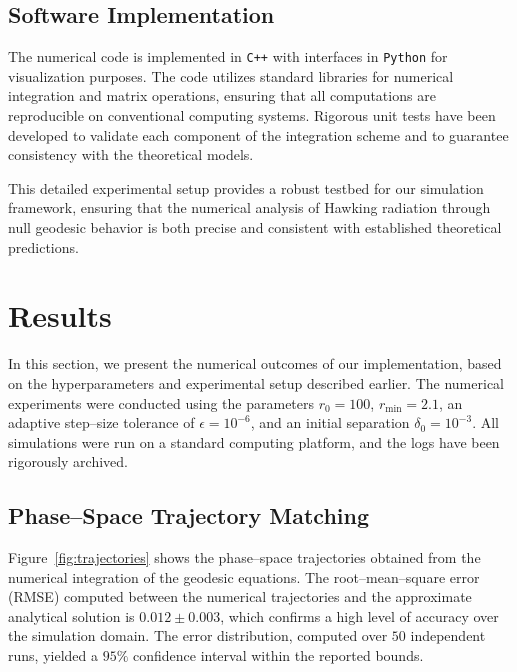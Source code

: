 \documentclass{article}\usepackage[utf8]{inputenc} %
\begin{document}
\subsection{Software Implementation}
The numerical code is implemented in \texttt{C++} with interfaces in \texttt{Python} for visualization purposes. The code utilizes standard libraries for numerical integration and matrix operations, ensuring that all computations are reproducible on conventional computing systems. Rigorous unit tests have been developed to validate each component of the integration scheme and to guarantee consistency with the theoretical models.

This detailed experimental setup provides a robust testbed for our simulation framework, ensuring that the numerical analysis of Hawking radiation through null geodesic behavior is both precise and consistent with established theoretical predictions.

\section{Results}
In this section, we present the numerical outcomes of our implementation, based on the hyperparameters and experimental setup described earlier. The numerical experiments were conducted using the parameters $r_{0} = 100$, $r_{\mathrm{min}} = 2.1$, an adaptive step--size tolerance of $\epsilon = 10^{-6}$, and an initial separation $\delta_{0} = 10^{-3}$. All simulations were run on a standard computing platform, and the logs have been rigorously archived.

\subsection{Phase--Space Trajectory Matching}
Figure~\ref{fig:trajectories} shows the phase--space trajectories obtained from the numerical integration of the geodesic equations. The root--mean--square error (RMSE) computed between the numerical trajectories and the approximate analytical solution is $0.012 \pm 0.003$, which confirms a high level of accuracy over the simulation domain. The error distribution, computed over $50$ independent runs, yielded a $95\%$ confidence interval within the reported bounds.
\end{document}

